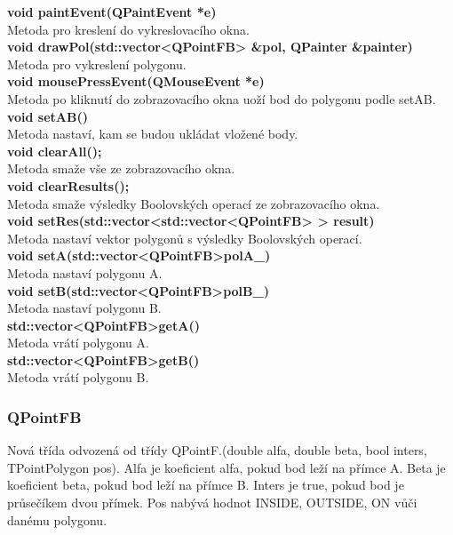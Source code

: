 \documentclass[a4paper, 12pt]{article}
\begin{document}
\textbf{void paintEvent(QPaintEvent *e)}\\
Metoda pro kreslení do vykreslovacího okna.\\

\textbf{void drawPol(std::vector\textless QPointFB> \&pol, QPainter \&painter)}\\
Metoda pro vykreslení polygonu.\\

\textbf{void mousePressEvent(QMouseEvent *e)}\\
Metoda po kliknutí do zobrazovacího okna uoží bod do polygonu podle setAB.\\

\textbf{void setAB()}\\
Metoda nastaví, kam se budou ukládat vložené body.\\

\textbf{void clearAll();}\\
Metoda smaže vše ze zobrazovacího okna.\\

\textbf{void clearResults();}\\
Metoda smaže výsledky Boolovských operací ze zobrazovacího okna.\\

\textbf{void setRes(std::vector\textless std::vector\textless QPointFB> > result)}\\
Metoda nastaví vektor polygonů s výsledky Boolovských operací.\\

\textbf{void setA(std::vector\textless QPointFB\textgreater polA\_)}\\
Metoda nastaví polygonu A.\\

\textbf{void setB(std::vector\textless QPointFB\textgreater polB\_)}\\
Metoda nastaví polygonu B.\\

\textbf{std::vector\textless QPointFB\textgreater getA()}\\
Metoda vrátí polygonu A.\\

\textbf{std::vector\textless QPointFB\textgreater getB()}\\
Metoda vrátí polygonu B.\\


\subsubsection{QPointFB}
Nová třída odvozená od třídy QPointF.(double alfa, double beta, bool inters, TPointPolygon pos). Alfa je koeficient alfa, pokud bod leží na přímce A. 
Beta je koeficient beta, pokud bod leží na přímce B. Inters je true, pokud bod je průsečíkem dvou přímek. Pos nabývá hodnot INSIDE, OUTSIDE, ON vůči danému polygonu.\\
\end{document}
